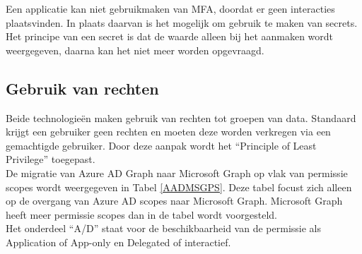 Een applicatie kan niet gebruikmaken van \ac{MFA}, doordat er geen interacties plaatsvinden. In plaats daarvan is het mogelijk om gebruik te maken van secrets. Het principe van een secret is dat de waarde alleen bij het aanmaken wordt weergegeven, daarna kan het niet meer worden opgevraagd.

\subsection{Gebruik van rechten}



Beide technologieën maken gebruik van rechten tot groepen van data. Standaard krijgt een gebruiker geen rechten en moeten deze worden verkregen via een gemachtigde gebruiker. Door deze aanpak wordt het “Principle of Least Privilege” toegepast. \\

De migratie van Azure \ac{AD} Graph naar Microsoft Graph op vlak van permissie scopes wordt weergegeven in Tabel \ref{AADMSGPS}. Deze tabel focust zich alleen op de overgang van Azure \ac{AD} scopes naar Microsoft Graph. Microsoft Graph heeft meer permissie scopes dan in de tabel wordt voorgesteld. \\

Het onderdeel “A/D” staat voor de beschikbaarheid van de permissie als Application of App-only en Delegated of interactief. \\


